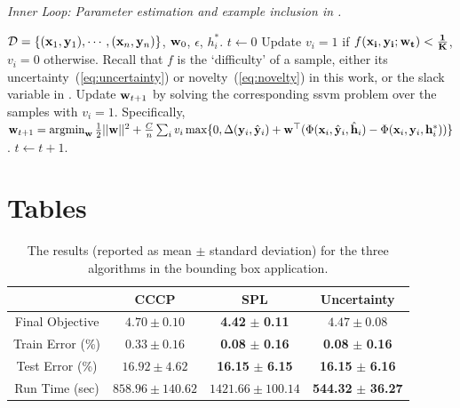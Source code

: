 \documentclass{article}
\newcommand{\mysection}[1]{\vspace{-4mm}\section{#1}\vspace{-4mm}}
\newcommand{\mytopcaption}[1]{\caption{\em \footnotesize #1}}
\newcommand{\argmin}{\operatornamewithlimits{argmin}}
\begin{document}
\begin{algorithm}[h!]
\mytopcaption{Inner Loop: Parameter estimation and example inclusion in \sc{SPL}.}
\label{algo:latentSSVM}
\begin{algorithmic}[1]
\INPUT ${\cal D} = \{({\bf x}_1,{\bf y}_1),\cdots,({\bf x}_n,{\bf y}_n)\}$, ${\bf w}_0$, $\epsilon$, $h_i^*$.
\STATE $t \leftarrow 0$
\REPEAT
\STATE Update $v_i = 1$ if $f(\bf x_i, \bf y_i;\bf w_t) < \frac{1}{K}$, $v_i=0$ otherwise.  Recall that $f$ is the `difficulty' of a sample, either its uncertainty~(\ref{eq:uncertainty}) or novelty~(\ref{eq:novelty}) in this work, or the slack variable in \cite{SPL}.
\STATE Update ${\bf w}_{t+1}$ by solving the corresponding
{\sc ssvm} problem over the samples with $v_i=1$. Specifically, \\
${\bf w}_{t+1} = \argmin_{\bf w} \frac{1}{2}||{\bf w}||^2 + \frac{C}{n}\sum_{i} v_i\max\{0,\Delta({\bf y}_i,\hat{\bf y}_i) +
		{\bf w}^\top (\Phi({\bf x}_i,\hat{\bf y}_i,\hat{\bf h}_i) - \Phi({\bf x}_i,{\bf y}_i,{\bf h}_i^*))\}$.
\STATE $t \leftarrow t + 1$.
\end{algorithmic}
\end{algorithm}

\mysection{Tables}
\label{sec:tables}
\begin{table}
\caption{The results (reported as mean $\pm$ standard deviation) for the three algorithms in the bounding box application. }
\begin{center}
\begin{tabular}{|c|c|c|c|}
\hline  & CCCP & SPL & Uncertainty \\\hline
Final Objective & $4.70 \pm 0.10$ & \textbf{4.42} $\pm$ \textbf{0.11} & $4.47 \pm 0.08$ \\\hline
Train Error (\%) & $0.33 \pm 0.16$ & \textbf{0.08} $\pm$ \textbf{0.16} & \textbf{0.08} $\pm$ \textbf{0.16}  \\ \hline
Test Error (\%) & $16.92 \pm 4.62$ & \textbf{16.15} $\pm$ \textbf{6.15} & \textbf{16.15} $\pm$ \textbf{6.16} \\ \hline
Run Time (sec) & $858.96 \pm 140.62$ & $1421.66 \pm 100.14$ & \textbf{544.32} $\pm$ \textbf{36.27} \\ \hline
\end{tabular}
\end{center}
\label{tbl:bbox}
\end{table}
\end{document}
